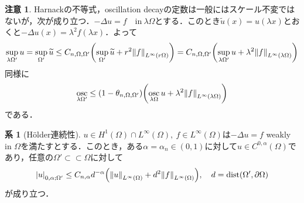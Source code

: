 \documentclass[a4paper]{ltjsarticle}
\newcommand{\Om}{\Omega}
\newcommand{\pOm}{\partial\Omega}
\newcommand{\ssubset}{\subset\subset}
\newcommand{\inn}{\quad\text{in}\ }
\newcommand{\1}{\mathbbm{1}}
\DeclareMathOperator{\dist}{\mathrm{dist}}
\DeclareMathOperator*{\osc}{\mathrm{osc}}
\numberwithin{equation}{section}
\theoremstyle{definition}
\newtheorem{cor}[thm]{系}
\newtheorem{rmk}[thm]{注意}
\begin{document}
\begin{rmk}\label{rmk:scale_dependence_of_const}
    Harnackの不等式，oscillation decayの定数は一般にはスケール不変ではないが，次が成り立つ．$-\Delta u=f\inn \lambda \Om$とする．このとき$\widetilde{u}(x)=u(\lambda x)$とおくと$-\Delta u(x)=\lambda^2f(\lambda x)$．よって
    \begin{equation}
        \sup_{\lambda \Om'}u=\sup_{\Om'}\widetilde{u}\leq C_{n,\Om,\Om'}\qty(\sup_{\Om'}\widetilde{u}+r^2\norm{f}_{L^\infty(r\Om)})=C_{n,\Om,\Om'}\qty(\sup_{\lambda\Om'}u+\lambda^2\norm{f}_{L^\infty(\lambda\Om)})
    \end{equation}
    同様に
    \begin{equation}
        \osc_{\lambda\Om'}\leq (1-\theta_{n,\Om,\Om'})\qty(\osc_{\lambda\Om}u+\lambda^2\norm{f}_{L^\infty(\lambda \Om)})
    \end{equation}
    である．
\end{rmk}
\begin{cor}[Hölder連続性]\label{cor:holder_continuity}
    $u\in H^1(\Om)\cap L^\infty(\Om),\ f\in L^\infty(\Om)$は$-\Delta u=f$ weakly in $\Om$を満たすとする．このとき，ある$\alpha=\alpha_n\in(0,1)$に対して$u\in C^{0,\alpha}(\Om)$であり，任意の$\Om'\ssubset \Om$に対して
    \begin{equation}
        \abs{u}_{0,\alpha;\Om'}\leq C_{n,\alpha}d^{-\alpha}\qty(\norm{u}_{L^\infty(\Om)}+d^{2}\norm{f}_{L^\infty(\Om)}),\quad d=\dist(\Om',\pOm)
    \end{equation}
    が成り立つ．
\end{cor}
\end{document}
